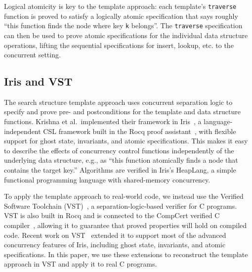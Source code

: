 \documentclass[sigplan,screen]{acmart}
\begin{document}
{Logical atomicity is key to the template approach: each template's \lstinline{traverse} function is proved to satisfy a logically atomic specification that says roughly ``this function finds the node where key \lstinline{k} belongs''. The \lstinline{traverse} specification can then be used to prove atomic specifications for the individual data structure operations, lifting the sequential specifications for insert, lookup, etc. to the concurrent setting.

\subsection{Iris and VST}
The search structure template approach uses concurrent separation logic to specify and prove pre- and postconditions for the template and data structure functions. Krishna et al.~implemented their framework in Iris~\cite{iris}, a language-independent CSL framework built in the Rocq proof assistant~\cite{rocq}, with flexible support for ghost state, invariants, and atomic specifications. This makes it easy to describe the effects of concurrency control functions independently of the underlying data structure, e.g., as ``this function atomically finds a node that contains the target key.'' %
Algorithms are verified in Iris's HeapLang, a simple functional programming language with shared-memory concurrency.

To apply the template approach to real-world code, we instead use the Verified Software Toolchain (VST)~\cite{plcc}, a separation-logic-based verifier for C programs. VST is also built in Rocq and is connected to the CompCert verified C compiler~\cite{compcert}, allowing it to guarantee that proved properties will hold on compiled code. Recent work on VST~\cite{iris-vst-arxiv} extended it to support most of the advanced concurrency features of Iris, including ghost state, invariants, and atomic specifications. In this paper, we use these extensions to reconstruct the template approach in VST and apply it to real C programs. %
}
\end{document}
